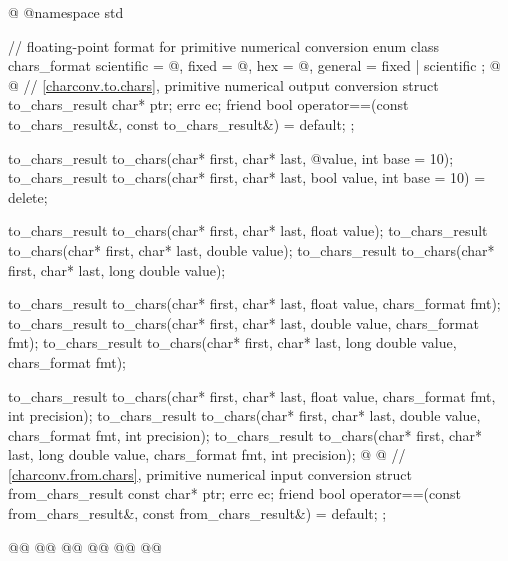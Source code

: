 \documentclass{wg21}
\begin{document}
\begin{codeblock}
@%
%
%
%
%
@namespace std {
    // floating-point format for primitive numerical conversion
    enum class chars_format {
        scientific = @\unspec@,
        fixed = @\unspec@,
        hex = @\unspec@,
        general = fixed | scientific\textbf{}
    };
    @%
    @
    // \ref{charconv.to.chars}, primitive numerical output conversion
    struct to_chars_result {
        char* ptr;
        errc ec;
        friend bool operator==(const to_chars_result&, const to_chars_result&) = default;
    };

    to_chars_result to_chars(char* first, char* last, @\seebelow@ value, int base = 10);
    to_chars_result to_chars(char* first, char* last, bool value, int base = 10) = delete;

    to_chars_result to_chars(char* first, char* last, float value);
    to_chars_result to_chars(char* first, char* last, double value);
    to_chars_result to_chars(char* first, char* last, long double value);

    to_chars_result to_chars(char* first, char* last, float value, chars_format fmt);
    to_chars_result to_chars(char* first, char* last, double value, chars_format fmt);
    to_chars_result to_chars(char* first, char* last, long double value, chars_format fmt);

    to_chars_result to_chars(char* first, char* last, float value,
    chars_format fmt, int precision);
    to_chars_result to_chars(char* first, char* last, double value,
    chars_format fmt, int precision);
    to_chars_result to_chars(char* first, char* last, long double value,
    chars_format fmt, int precision);
    @%
    @
    // \ref{charconv.from.chars}, primitive numerical input conversion
    struct from_chars_result {
        const char* ptr;
        errc ec;
        friend bool operator==(const from_chars_result&, const from_chars_result&) = default;
    };

    @@
    @@
        @@
        @@
        @@
    @\added{ \};}@


}
\end{codeblock}
\end{document}
